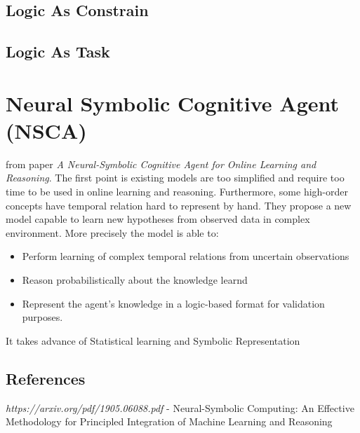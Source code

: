 \subsection{Logic As Constrain}
\subsection{Logic As Task}


 
 \section{Neural Symbolic Cognitive Agent (NSCA) }
 from paper \textit{A Neural-Symbolic Cognitive Agent for Online Learning and Reasoning}.
 The first point is existing models are too simplified and require too time to be used in online learning and reasoning. Furthermore, some high-order concepts have temporal relation hard to represent by hand. They propose a new model capable to learn new hypotheses from observed data in complex environment. More precisely the model is able to:
 \begin{itemize}
  \item Perform learning of complex temporal relations from uncertain observations
   \item Reason probabilistically  about the knowledge learnd
   \item Represent the  agent's knowledge in a logic-based format for validation purposes.
  \end{itemize} 
  It takes advance of Statistical learning and Symbolic Representation
  
  
 \subsection{References}
 \textit{https://arxiv.org/pdf/1905.06088.pdf} - Neural-Symbolic Computing: An Effective Methodology for Principled Integration of Machine Learning and Reasoning